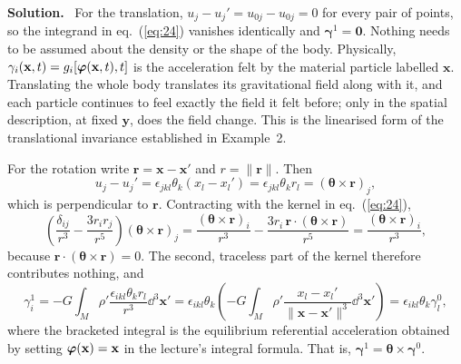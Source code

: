 \documentclass[a4paper,12pt]{paper}
\newenvironment{solution}{\par\noindent\textbf{Solution.}\ }{\par\medskip}
\begin{document}
\begin{solution}
For the translation, $u_{j}-u_{j}'=u_{0j}-u_{0j}=0$ for every pair of points, so the integrand in
eq.~(\ref{eq:24}) vanishes identically and $\bm{\gamma}^{1}=\mathbf{0}$. Nothing needs to be assumed
about the density or the shape of the body. Physically, $\gamma_{i}(\mathbf{x},t)=g_{i}[\bm{\varphi}(\mathbf{x},t),t]$
is the acceleration felt by the material particle labelled $\mathbf{x}$. Translating the whole body
translates its gravitational field along with it, and each particle continues to feel exactly the
field it felt before; only in the spatial description, at fixed $\mathbf{y}$, does the field change.
This is the linearised form of the translational invariance established in Example~2.

For the rotation write $\mathbf{r}=\mathbf{x}-\mathbf{x}'$ and $r=\|\mathbf{r}\|$. Then
\begin{equation}
u_{j}-u_{j}'=\epsilon_{jkl}\theta_{k}(x_{l}-x_{l}')=\epsilon_{jkl}\theta_{k}r_{l}=(\bm{\theta}\times\mathbf{r})_{j},
\label{eq:25}
\end{equation}
which is perpendicular to $\mathbf{r}$. Contracting with the kernel in eq.~(\ref{eq:24}),
\begin{equation}
\left(\frac{\delta_{ij}}{r^{3}}-\frac{3r_{i}r_{j}}{r^{5}}\right)(\bm{\theta}\times\mathbf{r})_{j}
=\frac{(\bm{\theta}\times\mathbf{r})_{i}}{r^{3}}-\frac{3r_{i}\,\mathbf{r}\cdot(\bm{\theta}\times\mathbf{r})}{r^{5}}
=\frac{(\bm{\theta}\times\mathbf{r})_{i}}{r^{3}},
\label{eq:26}
\end{equation}
because $\mathbf{r}\cdot(\bm{\theta}\times\mathbf{r})=0$. The second, traceless part of the kernel
therefore contributes nothing, and
\begin{equation}
\gamma_{i}^{1}=-G\int_{M}\rho'\frac{\epsilon_{ikl}\theta_{k}r_{l}}{r^{3}}\dd^{3}\mathbf{x}'
=\epsilon_{ikl}\theta_{k}\left(-G\int_{M}\rho'\frac{x_{l}-x_{l}'}{\|\mathbf{x}-\mathbf{x}'\|^{3}}\dd^{3}\mathbf{x}'\right)
=\epsilon_{ikl}\theta_{k}\gamma_{l}^{0},
\label{eq:27}
\end{equation}
where the bracketed integral is the equilibrium referential acceleration obtained by setting
$\bm{\varphi}(\mathbf{x})=\mathbf{x}$ in the lecture's integral formula. That is, $\bm{\gamma}^{1}=\bm{\theta}\times\bm{\gamma}^{0}$.


\end{solution}
\end{document}
